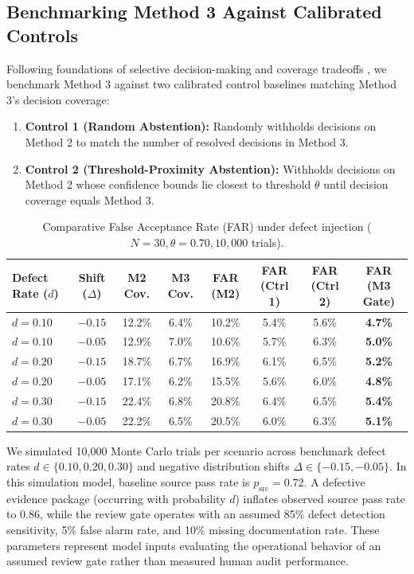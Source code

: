 \documentclass[runningheads]{llncs}
\begin{document}
\subsection{Benchmarking Method 3 Against Calibrated Controls}
Following foundations of selective decision-making and coverage tradeoffs \cite{el_yaniv_selective_classification_2010}, we benchmark Method 3 against two calibrated control baselines matching Method 3's decision coverage:
\begin{enumerate}[leftmargin=*]
    \item \textbf{Control 1 (Random Abstention):} Randomly withholds decisions on Method 2 to match the number of resolved decisions in Method 3.
    \item \textbf{Control 2 (Threshold-Proximity Abstention):} Withholds decisions on Method 2 whose confidence bounds lie closest to threshold $\theta$ until decision coverage equals Method 3.
\end{enumerate}

\begin{table}[t]
\caption{Comparative False Acceptance Rate (FAR) under defect injection ($N = 30, \theta = 0.70, 10,000$ trials).}
\label{tab:simulation_far}
\centering
\scriptsize
\setlength{\tabcolsep}{4pt}
\begin{tabular}{lccccccc}
\toprule
\textbf{Defect Rate ($d$)} & \textbf{Shift ($\Delta$)} & \textbf{M2 Cov.} & \textbf{M3 Cov.} & \textbf{FAR (M2)} & \textbf{FAR (Ctrl 1)} & \textbf{FAR (Ctrl 2)} & \textbf{FAR (M3 Gate)} \\
\midrule
$d = 0.10$ & $-0.15$ & 12.2\% & 6.4\% & 10.2\% & 5.4\% & 5.6\% & \textbf{4.7\%} \\
$d = 0.10$ & $-0.05$ & 12.9\% & 7.0\% & 10.6\% & 5.7\% & 6.3\% & \textbf{5.0\%} \\
$d = 0.20$ & $-0.15$ & 18.7\% & 6.7\% & 16.9\% & 6.1\% & 6.5\% & \textbf{5.2\%} \\
$d = 0.20$ & $-0.05$ & 17.1\% & 6.2\% & 15.5\% & 5.6\% & 6.0\% & \textbf{4.8\%} \\
$d = 0.30$ & $-0.15$ & 22.4\% & 6.8\% & 20.8\% & 6.4\% & 6.5\% & \textbf{5.4\%} \\
$d = 0.30$ & $-0.05$ & 22.2\% & 6.5\% & 20.5\% & 6.0\% & 6.3\% & \textbf{5.1\%} \\
\bottomrule
\end{tabular}
\end{table}

We simulated 10,000 Monte Carlo trials per scenario across benchmark defect rates $d \in \{0.10, 0.20, 0.30\}$ and negative distribution shifts $\Delta \in \{-0.15, -0.05\}$. In this simulation model, baseline source pass rate is $p_{\text{src}} = 0.72$. A defective evidence package (occurring with probability $d$) inflates observed source pass rate to $0.86$, while the review gate operates with an assumed 85\% defect detection sensitivity, 5\% false alarm rate, and 10\% missing documentation rate. These parameters represent model inputs evaluating the operational behavior of an assumed review gate rather than measured human audit performance.
\end{document}
